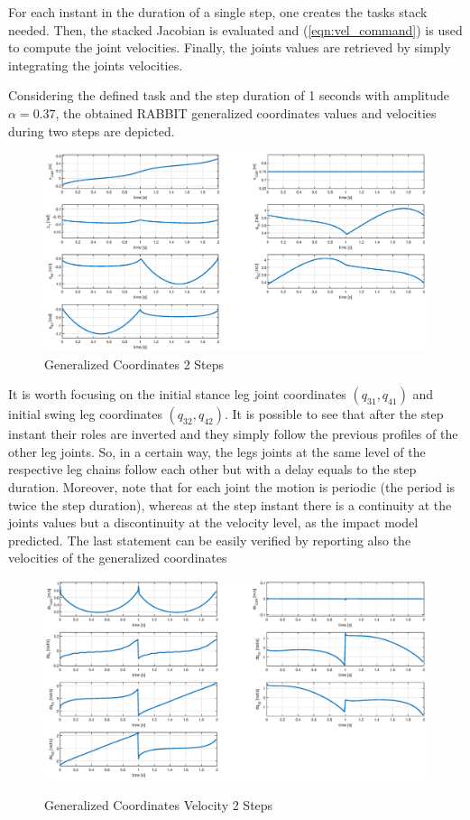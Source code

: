 \documentclass[11pt]{article}
\begin{document}
For each instant in the duration of a single step, one creates the tasks stack needed. Then, the stacked Jacobian is evaluated and (\ref{eqn:vel_command}) is used to compute the joint velocities. Finally, the joints values are retrieved by simply integrating the joints velocities.

Considering the defined task and the step duration of 1 seconds with amplitude $\alpha = 0.37$, the obtained RABBIT generalized coordinates values and velocities during two steps are depicted.

\begin{figure}[H]
\includegraphics[width=1\linewidth]{Images/pos_2_steps_1_second.eps}
\caption{Generalized Coordinates 2 Steps}
\label{2steps}
\end{figure}

It is worth focusing on the initial stance leg joint coordinates $(q_{31},q_{41})$ and initial swing leg coordinates $(q_{32},q_{42})$. It is possible to see that after the step instant their roles are inverted and they simply follow the previous profiles of the other leg joints. So, in a certain way, the legs joints at the same level of the respective leg chains follow each other but with a delay equals to the step duration. Moreover, note that for each joint the motion is periodic (the period is twice the step duration), whereas at the step instant there is a continuity at the joints values but a discontinuity at the velocity level, as the impact model predicted. The last statement can be easily verified by reporting also the velocities of the generalized coordinates
\begin{figure}[H]
\includegraphics[width=1\linewidth]{Images/vel_2_steps_1_second.eps}
\label{fig:2_steps_1_second_vel}
\caption{Generalized Coordinates Velocity 2 Steps}
\end{figure}
\end{document}

